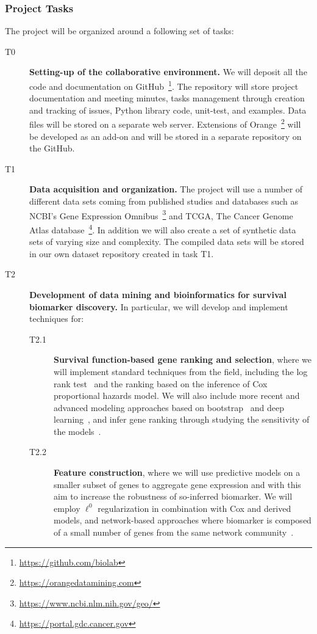 \documentclass[11pt,a4paper]{article}
\renewcommand{\bf}{\textbf}
\begin{document}
\subsubsection{Project Tasks}

The project will be organized around a following set of tasks:
\begin{description}
	\item[T0] \bf{Setting-up of the collaborative environment.} We will deposit all the code and documentation on GitHub~\footnote{\url{https://github.com/biolab}}. The repository will store project documentation and meeting minutes, tasks management through creation and tracking of issues, Python library code, unit-test, and examples. Data files will be stored on a separate web server. Extensions of Orange~\footnote{\url{https://orangedatamining.com}} will be developed as an add-on and will be stored in a separate repository on the GitHub.
	\item[T1] \bf{Data acquisition and organization.} The project will use a number of different data sets coming from published studies and databases such as NCBI's Gene Expression Omnibus~\footnote{\url{https://www.ncbi.nlm.nih.gov/geo/}} and TCGA, The Cancer Genome Atlas database~\footnote{\url{https://portal.gdc.cancer.gov}}. In addition we will also create a set of synthetic data sets of varying size and complexity. The compiled data sets will be stored in our own dataset repository created in task T1.
	\item[T2] \bf{Development of data mining and bioinformatics for survival biomarker discovery.} In particular, we will develop and implement techniques for:
	\begin{description}
		\item[T2.1] \bf{Survival function-based gene ranking and selection}, where we will implement standard techniques from the field, including the log rank test~\cite{} and the ranking based on the inference of Cox proportional hazards model. We will also include more recent and advanced modeling approaches based on bootstrap~\cite{} and deep learning~\cite{}, and infer gene ranking through studying the sensitivity of the models~\cite{}.
		\item[T2.2] \bf{Feature construction}, where we will use predictive models on a smaller subset of genes to aggregate gene expression and with this aim to increase the robustness of so-inferred biomarker. We will employ $\ell^0$ regularization in combination with Cox and derived models, and network-based approaches where biomarker is composed of a small number of genes from the same network community~\cite{}.

\end{description}
\end{description}
\end{document}
